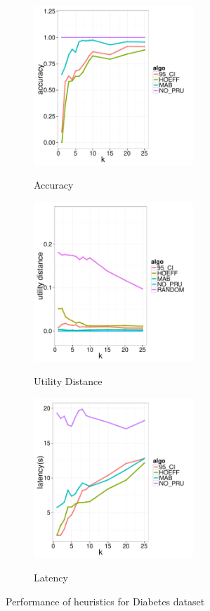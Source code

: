 \begin{figure}[t]
	\centering
	\begin{subfigure}{0.33\linewidth}
		\centering
		{\includegraphics[width=6cm] {Images/in_memory_dia_accuracy.pdf}}
		\caption{Accuracy}
		\label{fig:dia_accuracy}
	\end{subfigure}
	\begin{subfigure}{0.33\linewidth}
		\centering
		{\includegraphics[width=6cm] {Images/in_memory_dia_utility_dist.pdf}}
		\caption{Utility Distance}
		\label{fig:dia_utility_dist}
	\end{subfigure}
	\begin{subfigure}{0.33\linewidth}
		\centering
		{\includegraphics[width=6cm] {Images/in_memory_dia_latency.pdf}}
		\caption{Latency}
		\label{fig:diabetes_latency}
	\end{subfigure}
	\caption{Performance of heuristics for Diabetes dataset}
	\label{fig:diabetes_perf}
\end{figure}


